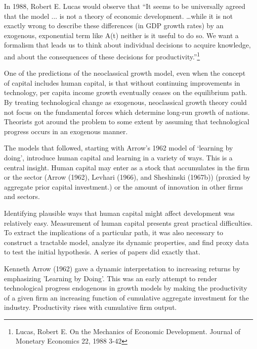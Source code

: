 In 1988, Robert E. Lucas would observe that ``It seems to be universally agreed that the model ... is not a theory of economic development.   \dots while it is not exactly wrong to describe these differences (in GDP  growth rates) by an exogenous, exponential term like A(t) neither is it useful to do so. We want a formalism that leads us to think about individual decisions to acquire knowledge, and about the consequences of these decisions for productivity.''\footnote{Lucas,  Robert E. On the Mechanics of Economic Development. Journal of Monetary Economics 22, 1988 3-42} 


One of the predictions of the neoclassical growth model, even  when the concept of capital includes human capital, is that without  continuing improvements in technology, per capita income growth eventually ceases on the equilibrium path. 
By treating technological change as exogenous, neoclassical growth theory could not focus on the fundamental forces which determine long-run growth of nations. Theorists got around the problem to some extent by assuming that technological progress occurs in an exogenous manner. 

The models that followed, starting with Arrow's 1962 model of `learning by doing', introduce human capital and learning in a variety of ways. This is a central insight. Human capital may enter  as a stock that accumulates in the firm or the sector (Arrow (1962), Levhari (1966), and Sheshinski (1967b)) (proxied by aggregate prior capital investment.)
or the amount of innovation in other firms and sectors. %

Identifying  plausible ways that human capital might affect development was relatively easy. Measurement of human capital presents great practical difficulties. To extract the implications of a particular path, it was also necessary to construct a tractable model, analyze its dynamic properties, and find proxy data to test the initial hypothesis.   A series of papers did exactly that.

Kenneth Arrow (1962) gave a dynamic interpretation to increasing returns by emphasizing 'Learning by Doing'. This was an early attempt to render technological progress endogenous in growth models by making the productivity of a given firm an increasing function of cumulative aggregate investment for the industry. Productivity rises with cumulative firm output.

